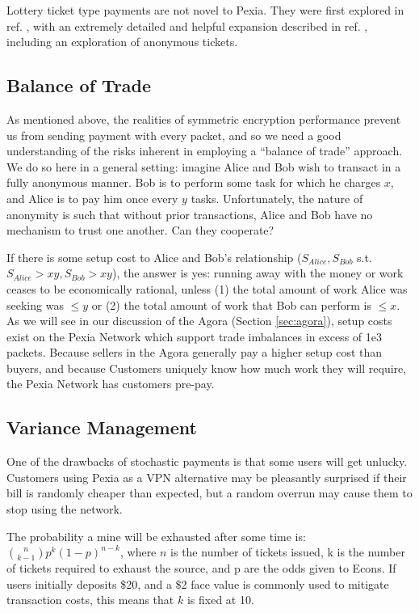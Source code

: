 \documentclass{article}
\newcommand{\mesh}{Pexia}
\begin{document}
Lottery ticket type payments are not novel to \mesh{}. They were first explored in ref. \cite{txnbets}, with an extremely detailed and helpful expansion described in ref. \cite{DAM}, including an exploration of anonymous tickets.

\subsection{Balance of Trade}
\label{tokens-bot}

As mentioned above, the realities of symmetric encryption performance prevent us from sending payment with every packet, and so we need a good understanding of the risks inherent in employing a ``balance of trade'' approach. We do so here in a general setting: imagine Alice and Bob wish to transact in a fully anonymous manner. Bob is to perform some task for which he charges $x$, and Alice is to pay him once every $y$ tasks. Unfortunately, the nature of anonymity is such that without prior transactions, Alice and Bob have no mechanism to trust one another. Can they cooperate?

If there is some setup cost to Alice and Bob's relationship ($S_{Alice}, S_{Bob}$ s.t. $S_{Alice} > xy, S_{Bob} > xy$), the answer is yes: running away with the money or work ceases to be economically rational, unless (1) the total amount of work Alice was seeking was $\leq y$ or (2) the total amount of work that Bob can perform is $\leq x$. As we will see in our discussion of the Agora (Section \ref{sec:agora}), setup costs exist on the \mesh{} Network which support trade imbalances in excess of 1e3 packets. Because sellers in the Agora generally pay a higher setup cost than buyers, and because Customers uniquely know how much work they will require, the \mesh{} Network has customers pre-pay.

\subsection{Variance Management}

One of the drawbacks of stochastic payments is that some users will
get unlucky. Customers using \mesh{} as a VPN alternative may be
pleasantly surprised if their bill is randomly cheaper than expected,
but a random overrun may cause them to stop using the network.

The probability a mine will be exhausted after some time is:
$\binom{n}{k-1} p^{k} (1-p)^{n-k}$, where $n$ is the number of tickets
issued, k is the number of tickets required to exhaust the source, and
p are the odds given to Econs. If users initially deposits \$20, and a
\$2 face value is commonly used to mitigate transaction costs, this
means that $k$ is fixed at 10.
\end{document}
